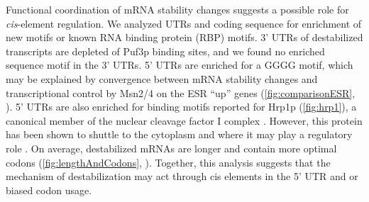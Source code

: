 Functional coordination of mRNA stability changes suggests  a possible
role for \textit{cis}-element regulation. We analyzed UTRs and coding
sequence for enrichment of new motifs or known RNA binding protein
(RBP) motifs.
3’ UTRs of destabilized transcripts are
depleted of Puf3p binding sites, and we found no enriched sequence
motif in the 3' UTRs.
5’ UTRs are enriched for a GGGG motif, which
may be explained by convergence between mRNA stability changes and
transcriptional control by Msn2/4 on the ESR “up” genes
(\autoref{fig:comparisonESR},
\cite{gasch2000genomic,canadell2015impact}). 
5’ UTRs are also enriched for binding motifs reported for Hrp1p 
(\autoref{fig:hrp1}),
a canonical member of the nuclear cleavage factor I complex
\parencite{chen1998specific}.
However, this protein has been shown to shuttle to the cytoplasm
and where it may play a regulatory role
\parencite{kessler1997hrp1,kebaara2003upf,guisbert2005functional}.
On average,
destabilized mRNAs are longer and contain more optimal codons
(\autoref{fig:lengthAndCodons}, \cite{khong2017stress}). 
Together, this analysis suggests that the
mechanism of destabilization may act through cis elements in the 5’
UTR and or biased codon usage.



